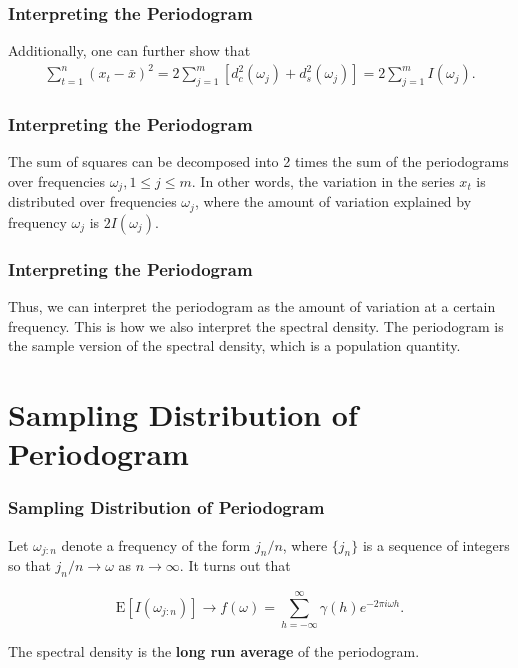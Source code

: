\documentclass[%
xcolor=pdftex]{beamer}
\begin{document}
\begin{frame}
\frametitle{Interpreting the Periodogram}

Additionally, one can further show that
\begin{eqnarray*}
\sum^n_{t=1}(x_t-\bar{x})^2 =  2\sum^{m}_{j=1}[d^2_c(\omega_j)+d^2_s(\omega_j)] = 2\sum^m_{j=1}I(\omega_j).
\end{eqnarray*}
\end{frame}

\begin{frame}
\frametitle{Interpreting the Periodogram}

The sum of squares can be decomposed into 2 times the
sum of the periodograms over frequencies $\omega_j,1\le j\le
m$. In other words, the variation in the series $x_t$ is
distributed over frequencies $\omega_j$, where the amount of variation explained by
frequency $\omega_j$ is $2I(\omega_j)$.

\end{frame}

\begin{frame}
\frametitle{Interpreting the Periodogram}

Thus, we can interpret the periodogram as the amount of
variation at a certain frequency.  This is how we also
interpret the spectral density.  The periodogram is the sample
version of the spectral density, which is a population quantity.

\end{frame}

\section{Sampling Distribution of Periodogram}
\frame{\tableofcontents[currentsection]}

\begin{frame}
\frametitle{Sampling Distribution of Periodogram}

Let $\omega_{j:n}$ denote a frequency of the form $j_n/n$, where $\{ j_n\}$ is a sequence of integers so that $j_n/n \to \omega$ as $n \to \infty$. It turns out that

$$
\mbox{E}[I(\omega_{j:n})] \to f(\omega) = \sum^\infty_{h=-\infty} \gamma(h) e^{-2\pi i\omega h}.
$$

The spectral density is the \textbf{long run average} of the periodogram.

\end{frame}
\end{document}
